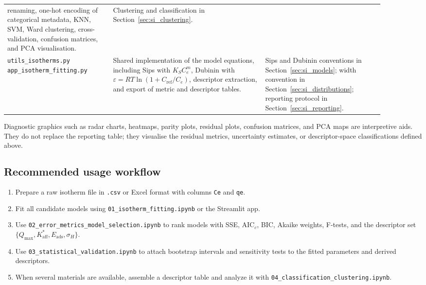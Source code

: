 \documentclass[journal=jacsat,manuscript=article]{achemso}
\begin{document}
\begin{table}[H]
\begin{tabular}{p{0.25\linewidth}p{0.36\linewidth}p{0.29\linewidth}}
		renaming, one-hot encoding of categorical metadata, KNN, SVM,
		Ward clustering, cross-validation, confusion matrices, and PCA
		visualisation. &
		Clustering and classification in Section~\ref{sec:si_clustering}. \\
		\addlinespace
		\makecell[l]{\texttt{utils\_isotherms.py}\\
		\texttt{app\_isotherm\_fitting.py}} &
		Shared implementation of the model equations, including Sips with
		\(K_S C_e^m\), Dubinin with
		\(\varepsilon=RT\ln(1+C_{\mathrm{ref}}/C_e)\), descriptor
		extraction, and export of metric and descriptor tables. &
		Sips and Dubinin conventions in Section~\ref{sec:si_models};
		width convention in Section~\ref{sec:si_distributions};
		reporting protocol in Section~\ref{sec:si_reporting}. \\
		\bottomrule
	\end{tabular}
\end{table}

Diagnostic graphics such as radar charts, heatmaps, parity plots, residual
plots, confusion matrices, and PCA maps are interpretive aids. They do not
replace the reporting table; they visualise the residual metrics, uncertainty
estimates, or descriptor-space classifications defined above.

\subsection{Recommended usage workflow}
\label{sec:si_notebook_workflow}

\begin{enumerate}
	\item Prepare a raw isotherm file in \texttt{.csv} or Excel format with
	columns \texttt{Ce} and \texttt{qe}.
	\item Fit all candidate models using
	\texttt{01\_isotherm\_fitting.ipynb} or the Streamlit app.
	\item Use \texttt{02\_error\_metrics\_model\_selection.ipynb} to rank models
	with SSE, AIC$_c$, BIC, Akaike weights, F-tests, and the descriptor set
	$\{Q_{\max}, K_{\mathrm{aff}}^{\ast}, E_{\mathrm{ads}}, \sigma_H\}$.
	\item Use \texttt{03\_statistical\_validation.ipynb} to attach bootstrap
	intervals and sensitivity tests to the fitted parameters and derived
	descriptors.
	\item When several materials are available, assemble a descriptor table and
	analyze it with \texttt{04\_classification\_clustering.ipynb}.
\end{enumerate}
\end{document}
